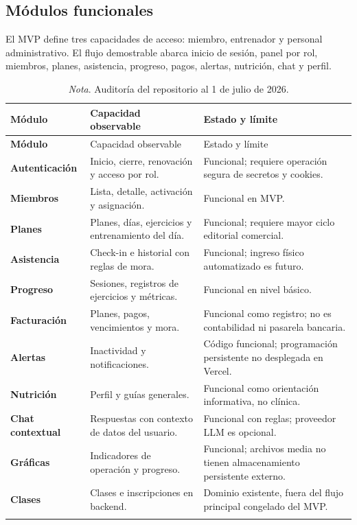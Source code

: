 \subsection{Módulos funcionales}

El MVP define tres capacidades de acceso: miembro, entrenador y personal
administrativo. El flujo demostrable abarca inicio de sesión, panel por rol,
miembros, planes, asistencia, progreso, pagos, alertas, nutrición, chat y perfil.

\begin{longtable}{>{\bfseries}p{3.1cm}p{7.3cm}p{3.8cm}}
\caption{Estado de los módulos del MVP}\label{tab:modulos}\\
\toprule
Módulo & Capacidad observable & Estado y límite \\
\midrule
\endfirsthead
\toprule
Módulo & Capacidad observable & Estado y límite \\
\midrule
\endhead
Autenticación & Inicio, cierre, renovación y acceso por rol. & Funcional; requiere operación segura de secretos y cookies. \\
Miembros & Lista, detalle, activación y asignación. & Funcional en MVP. \\
Planes & Planes, días, ejercicios y entrenamiento del día. & Funcional; requiere mayor ciclo editorial comercial. \\
Asistencia & Check-in e historial con reglas de mora. & Funcional; ingreso físico automatizado es futuro. \\
Progreso & Sesiones, registros de ejercicios y métricas. & Funcional en nivel básico. \\
Facturación & Planes, pagos, vencimientos y mora. & Funcional como registro; no es contabilidad ni pasarela bancaria. \\
Alertas & Inactividad y notificaciones. & Código funcional; programación persistente no desplegada en Vercel. \\
Nutrición & Perfil y guías generales. & Funcional como orientación informativa, no clínica. \\
Chat contextual & Respuestas con contexto de datos del usuario. & Funcional con reglas; proveedor LLM es opcional. \\
Gráficas & Indicadores de operación y progreso. & Funcional; archivos media no tienen almacenamiento persistente externo. \\
Clases & Clases e inscripciones en backend. & Dominio existente, fuera del flujo principal congelado del MVP. \\
\bottomrule
\caption*{\textit{Nota}. Auditoría del repositorio al 1 de julio de 2026.}
\end{longtable}

